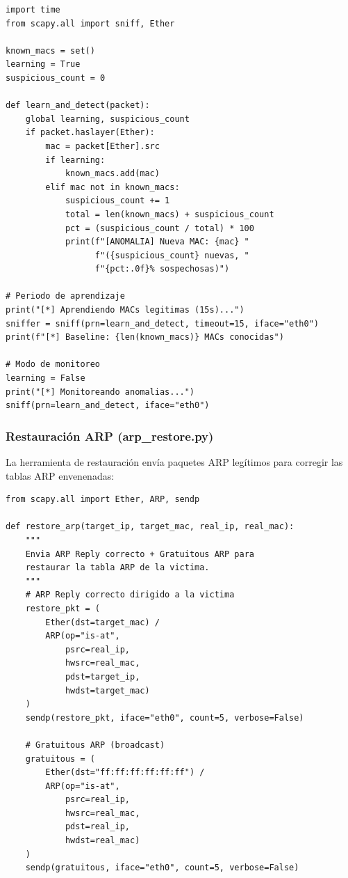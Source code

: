 \documentclass[12pt, a4paper]{article}
\begin{document}
\begin{lstlisting}[style=pythonstyle, caption={Detector de anomal\'ias MAC (mac\_anomaly\_detector.py)}]
import time
from scapy.all import sniff, Ether

known_macs = set()
learning = True
suspicious_count = 0

def learn_and_detect(packet):
    global learning, suspicious_count
    if packet.haslayer(Ether):
        mac = packet[Ether].src
        if learning:
            known_macs.add(mac)
        elif mac not in known_macs:
            suspicious_count += 1
            total = len(known_macs) + suspicious_count
            pct = (suspicious_count / total) * 100
            print(f"[ANOMALIA] Nueva MAC: {mac} "
                  f"({suspicious_count} nuevas, "
                  f"{pct:.0f}% sospechosas)")

# Periodo de aprendizaje
print("[*] Aprendiendo MACs legitimas (15s)...")
sniffer = sniff(prn=learn_and_detect, timeout=15, iface="eth0")
print(f"[*] Baseline: {len(known_macs)} MACs conocidas")

# Modo de monitoreo
learning = False
print("[*] Monitoreando anomalias...")
sniff(prn=learn_and_detect, iface="eth0")
\end{lstlisting}

\subsubsection{Restauraci\'on ARP (arp\_restore.py)}

La herramienta de restauraci\'on env\'ia paquetes ARP leg\'itimos para corregir las tablas ARP envenenadas:

\begin{lstlisting}[style=pythonstyle, caption={Restauraci\'on de tablas ARP (arp\_restore.py)}]
from scapy.all import Ether, ARP, sendp

def restore_arp(target_ip, target_mac, real_ip, real_mac):
    """
    Envia ARP Reply correcto + Gratuitous ARP para
    restaurar la tabla ARP de la victima.
    """
    # ARP Reply correcto dirigido a la victima
    restore_pkt = (
        Ether(dst=target_mac) /
        ARP(op="is-at",
            psrc=real_ip,
            hwsrc=real_mac,
            pdst=target_ip,
            hwdst=target_mac)
    )
    sendp(restore_pkt, iface="eth0", count=5, verbose=False)

    # Gratuitous ARP (broadcast)
    gratuitous = (
        Ether(dst="ff:ff:ff:ff:ff:ff") /
        ARP(op="is-at",
            psrc=real_ip,
            hwsrc=real_mac,
            pdst=real_ip,
            hwdst=real_mac)
    )
    sendp(gratuitous, iface="eth0", count=5, verbose=False)
\end{lstlisting}
\end{document}
